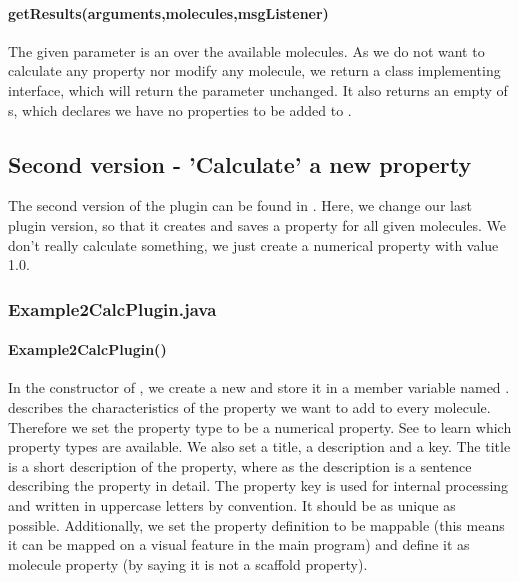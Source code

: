     \paragraph{getResults(arguments,molecules,msgListener)}
    The given  parameter is
    an  over the available molecules.
    As we do not want to calculate any property nor modify any molecule,
    we return a class implementing  interface,
    which will return the  parameter unchanged.
    It also returns an empty  of s,
    which declares we have no properties to be added to \sh.

\subsection{Second version - 'Calculate' a new property}
The second version of the plugin can be found in
.
Here, we change our last plugin version,
so that it creates and saves a property for all given molecules.
We don't really calculate something,
we just create a numerical property with value 1.0.

  \subsubsection{Example2CalcPlugin.java}
    \paragraph{Example2CalcPlugin()}
    In the constructor of ,
    we create a new 
    and store it in a member variable named .
     describes the characteristics of the property we want to add to every molecule.
    Therefore we set the property type to be a numerical property.
    See  to learn which property types are available.
    We also set a title, a description and a key.
    The title is a short description of the property,
    where as the description is a sentence describing the property in detail.
    The property key is used for internal processing and written in uppercase letters by convention.
    It should be as unique as possible.
    Additionally, we set the property definition to be mappable
    (this means it can be mapped on a visual feature in the main program)
    and define it as molecule property (by saying it is not a scaffold property).

